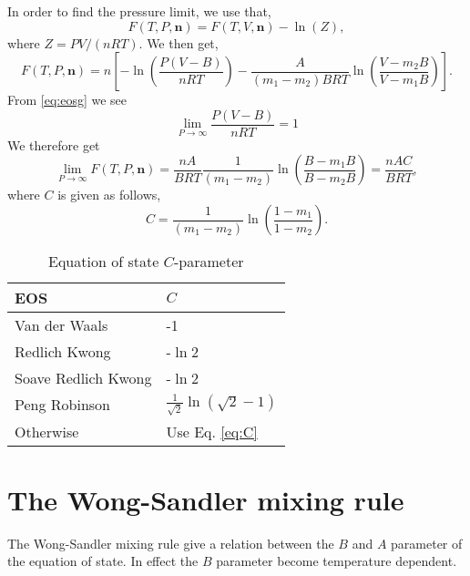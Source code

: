 \documentclass[internal,english]{sintefmemo2012}
\newcommand*{\vektor}[1]{\boldsymbol{#1}}%
\begin{document}
In order to find the pressure limit, we use that,
\begin{equation}
  F(T,P,\vektor{n}) = F(T,V,\vektor{n}) - \ln(Z),
\end{equation}
where $Z=PV/(nRT)$. We then get,
\begin{equation}
  F(T,P,\vektor{n})=
  n\left[-\ln\left(\frac{P\left(V-B\right)}{nRT}\right)-\frac{A}{\left(m_1-m_2\right)BRT}\ln\left(\frac{V-m_2B}{V-m_1B}\right)
  \right].
\end{equation} 
From \ref{eq:eosg} we see
\begin{equation}
\lim_{P\to\infty} \frac{P\left(V-B\right)}{nRT} = 1
\label{eq:plim}
\end{equation}
We therefore get
\begin{equation}
  \lim_{P\to\infty} F(T,P,\vektor{n})=
  \frac{nA}{BRT}
  \frac{1}{\left(m_1-m_2\right)}\ln\left(\frac{B-m_1B}{B-m_2B}\right)
  = \frac{nAC}{BRT},
  \label{eq:plimF}
\end{equation}
where $C$ is given as follows,
\begin{equation}
  C=
  \frac{1}{\left(m_1-m_2\right)}\ln\left(\frac{1-m_1}{1-m_2}\right).
  \label{eq:C}
\end{equation}
 
\begin{table}[htb]
\caption{Equation of state $C$-parameter}
\center
\begin{tabular}{ll}
  \hline
  EOS &         $C$   \\
  \hline
  Van der Waals		& -1 \\
  Redlich Kwong	 	& -$\ln{2}$ \\
  Soave Redlich Kwong	& -$\ln{2}$ \\
  Peng Robinson	        &
  $\frac{1}{\sqrt{2}}\ln{\left(\sqrt{2}-1\right)}$ \\
  Otherwise             & Use Eq. \ref{eq:C} \\
  \hline
\end{tabular}
\label{tab:C}
\end{table}

\section{The Wong-Sandler mixing rule}
The Wong-Sandler mixing rule give a relation between the $B$ and $A$
parameter of the equation of state. In effect the $B$ parameter become
temperature dependent.
\end{document}
